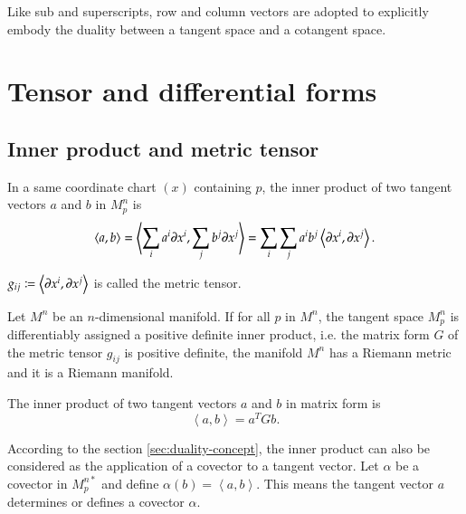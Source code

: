 \documentclass[11pt, a4paper]{book}
\begin{document}
Like sub and superscripts, row and column vectors are adopted to explicitly embody the
duality between a tangent space and a cotangent space.

\section{Tensor and differential forms}

\subsection{Inner product and metric tensor}
\label{sec:metric-tensor}

In a same coordinate chart $(x)$ containing $p$, the inner product of two tangent vectors
$a$ and $b$ in $M_p^n$ is
\begin{equation}
  \label{eq:inner-product}
  \left\langle a,b \right\rangle = \left\langle \sum_i a^i \boldsymbol{\partial}x^i, \sum_j b^j
    \boldsymbol{\partial}x^j \right\rangle = \sum_i\sum_j a^i b^j \left\langle \boldsymbol{\partial}x^i,
    \boldsymbol{\partial}x^j \right\rangle.
\end{equation}

\begin{Definition}
  \label{def:metric-tensor}
  $g_{ij} \coloneqq \left\langle \boldsymbol{\partial}x^i, \boldsymbol{\partial}x^j \right\rangle$ is
  called the metric tensor.
\end{Definition}

\begin{Definition}
  Let $M^n$ be an $n$-dimensional manifold. If for all $p$ in $M^n$, the tangent space
  $M_p^n$ is differentiably assigned a positive definite inner product, i.e. the matrix
  form $G$ of the metric tensor $g_{ij}$ is positive definite, the manifold $M^n$ has a
  Riemann metric and it is a Riemann manifold.
\end{Definition}

The inner product of two tangent vectors $a$ and $b$ in matrix form is
\begin{equation}
  \left\langle a,b \right\rangle = a^T G b.
\end{equation}

According to the section \ref{sec:duality-concept}, the inner product can also be
considered as the application of a covector to a tangent vector. Let $\alpha$ be a
covector in $M_p^{n*}$ and define $\alpha(b) = \left\langle a, b \right\rangle$. This
means the tangent vector $a$ determines or defines a covector $\alpha$.
\end{document}

